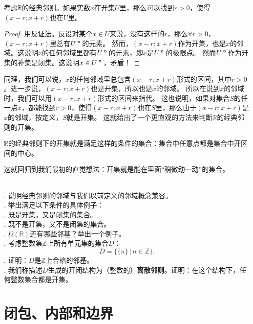 \documentclass[12pt,UTF8]{ctexbook}
\begin{document}
\begin{appendix}
\begin{tm}\label{tm:a-1-30}
    考虑$\mathbb{R}$的经典邻则。如果实数$x$在开集$U$里，那么可以找到$r>0$，使得$(x-r;x+r)$也在$U$里。
\end{tm}

\begin{proof}
    用反证法。反设对某个$x\in U$来说，没有这样的$r$，那么$\forall r>0$，$(x-r;x+r)$里总有$U^{\bu}$的元素。
    然而，$(x-r;x+r)$作为开集，也是$x$的邻域。这说明$x$的任何邻域里都有$U^{\bu}$的元素，即$x$是$U^{\bu}$的极限点。
    然而$U^{\bu}$作为开集的补集是闭集。这说明$x\in U^{\bu}$，矛盾！
\end{proof}

同理，我们可以说，$x$的任何邻域里总包含$(x-r;x+r)$形式的区间，其中$r>0$。进一步说，$(x-r;x+r)$也是开集，所以也是$x$的邻域。
所以在说到$x$的邻域时，我们可以用$(x-r;x+r)$形式的区间来指代。
这也说明，如果对集合$S$的任一点$x$，都能找到$r>0$，使得$(x-r;x+r)$也在$S$里，那么由于$(x-r;x+r)$是$x$的邻域，按定义，$S$就是开集。
这就给出了一个更直观的方法来判断$\mathbb{R}$的经典邻则的开集。

\begin{tm}\label{tm:a-1-40}
    $\mathbb{R}$的经典邻则下的开集就是满足这样的条件的集合：集合中任意点都是集合中开区间的中心。
\end{tm}
这就回归到我们最初的直觉想法：开集就是能在里面“稍微动一动”的集合。

\begin{xt}
    \mbox{} \\
    . 说明经典邻则的邻域与我们以前定义的邻域概念兼容。\\
    . 举出满足以下条件的具体例子：\\
    . 既是开集，又是闭集的集合。\\
    . 既不是开集，又不是闭集的集合。\\
    . $\Omega(\mathbb{R})$还有哪些邻基？举出一个例子。\\
    . 考虑整数集$\mathbb{Z}$上所有单元集的集合$D$：
    $$ D = \{\{n\} \, | \, n \in  \mathbb{Z}\}.$$
    . 证明：$D$是$\mathbb{Z}$上合格的邻基。\\
    . 我们称描述$D$生成的开闭结构为（整数的）\textbf{离散邻则}。证明：在这个结构下，任何整数集合都是开集。
\end{xt}

\section{闭包、内部和边界}


\end{appendix}
\end{document}
